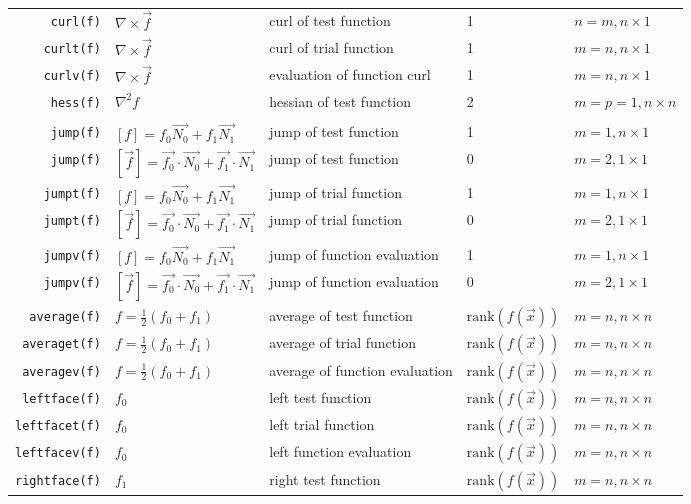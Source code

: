 \begin{longtable}[c]{rllll}
  \lstinline!curl(f)! & $\nabla \times \overrightarrow{f}$ & curl of test function & 1 & $n=m, n\times 1$\\
  \lstinline!curlt(f)! & $\nabla \times \overrightarrow{f}$ & curl of trial function & 1 & $m=n, n\times 1$\\
  \lstinline!curlv(f)! & $\nabla \times \overrightarrow{f}$ & evaluation of  function curl  & 1 & $m=n, n\times 1$\\

  \lstinline!hess(f)! & $\nabla^2 f$ & hessian of test function & 2 & $m=p=1, n\times n$\\\hline\\

  \lstinline!jump(f)! & $[f]=f_0\overrightarrow{N_0}+f_1\overrightarrow{N_1}$ & jump of test function & 1   & $m=1, n\times 1$\\
  \lstinline!jump(f)! & $[\overrightarrow{f}]=\overrightarrow{f_0}\cdot\overrightarrow{N_0}+\overrightarrow{f_1}\cdot\overrightarrow{N_1}$ & jump of test function & 0   & $m=2, 1\times 1$\\
  \lstinline!jumpt(f)! & $[f]=f_0\overrightarrow{N_0}+f_1\overrightarrow{N_1}$ & jump of trial function & 1   & $m=1, n\times 1$\\
  \lstinline!jumpt(f)! & $[\overrightarrow{f}]=\overrightarrow{f_0}\cdot\overrightarrow{N_0}+\overrightarrow{f_1}\cdot\overrightarrow{N_1}$ & jump of trial function & 0   & $m=2, 1\times 1$\\
  \lstinline!jumpv(f)! & $[f]=f_0\overrightarrow{N_0}+f_1\overrightarrow{N_1}$ & jump of  function evaluation & 1   & $m=1, n\times 1$\\
  \lstinline!jumpv(f)! & $[\overrightarrow{f}]=\overrightarrow{f_0}\cdot\overrightarrow{N_0}+\overrightarrow{f_1}\cdot\overrightarrow{N_1}$ & jump of  function evaluation & 0   & $m=2, 1\times 1$\\
  \lstinline!average(f)! & ${f}=\frac{1}{2}(f_0+f_1)$ & average of test function & $\mathrm{rank}( f(\overrightarrow{x}))$   & $m=n, n\times n$\\
  \lstinline!averaget(f)! & ${f}=\frac{1}{2}(f_0+f_1)$ & average of trial function & $\mathrm{rank}( f(\overrightarrow{x}))$   & $m=n, n\times n$\\
  \lstinline!averagev(f)! & ${f}=\frac{1}{2}(f_0+f_1)$ & average of  function evaluation & $\mathrm{rank}( f(\overrightarrow{x}))$   & $m=n, n\times n$\\

  \lstinline!leftface(f)! & $f_0$ & left  test function & $\mathrm{rank}( f(\overrightarrow{x}))$   & $m=n, n\times n$\\
  \lstinline!leftfacet(f)! & $f_0$ & left  trial function & $\mathrm{rank}( f(\overrightarrow{x}))$   & $m=n, n\times n$\\
  \lstinline!leftfacev(f)! & $f_0$ & left   function evaluation & $\mathrm{rank}( f(\overrightarrow{x}))$   & $m=n, n\times n$\\
  \lstinline!rightface(f)! & $f_1$ & right  test function & $\mathrm{rank}( f(\overrightarrow{x}))$   & $m=n, n\times n$\\


\end{longtable}
